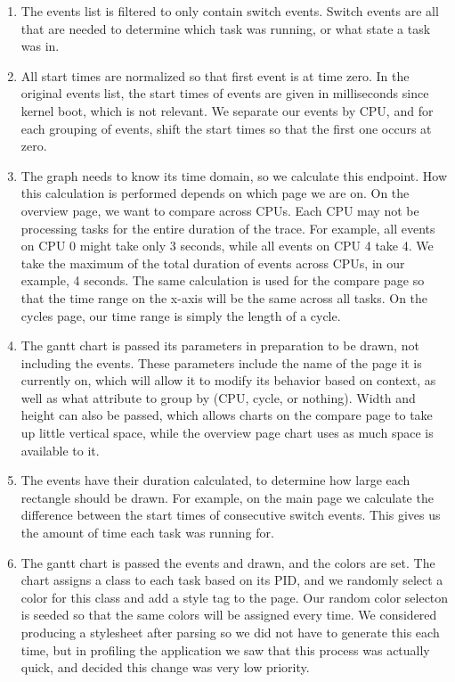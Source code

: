 \documentclass{hmcclinic}
\begin{document}
  \begin{enumerate}

    \item The events list is filtered to only contain switch events. Switch
      events are all that are needed to determine which task was running, or
      what state a task was in.
  
    \item All start times are normalized so that first event is at time zero.
      In the original events list, the start times of events are given in
      milliseconds since kernel boot, which is not relevant. We separate our
      events by CPU, and for each grouping of events, shift the start times
      so that the first one occurs at zero.
  
    \item The graph needs to know its time domain, so we calculate this
      endpoint. How this calculation is performed depends on which page we are
      on. On the overview page, we want to compare across CPUs. Each CPU may not
      be processing tasks for the entire duration of the trace. For example, all
      events on CPU 0 might take only 3 seconds, while all events on CPU 4 take
      4. We take the maximum of the total duration of events across CPUs, in our
      example, 4 seconds. The same calculation is used for the compare page so
      that the time range on the x-axis will be the same across all tasks.  On
      the cycles page, our time range is simply the length of a cycle.
  
    \item The gantt chart is passed its parameters in preparation to be drawn,
      not including the events. These parameters include the name of the page it
      is currently on, which will allow it to modify its behavior based on
      context, as well as what attribute to group by (CPU, cycle, or nothing).
      Width and height can also be passed, which allows charts on the compare
      page to take up little vertical space, while the overview page chart uses
      as much space is available to it.
  
   \item The events have their duration calculated, to determine how large each
     rectangle should be drawn. For example, on the main page we calculate the
     difference between the start times of consecutive switch events. This gives
     us the amount of time each task was running for.
  
   \item The gantt chart is passed the events and drawn, and the colors are set.
     The chart assigns a class to each task based on its PID, and we randomly
     select a color for this class and add a style tag to the page. Our random
     color selecton is seeded so that the same colors will be assigned every
     time. We considered producing a stylesheet after parsing so we did not have
     to generate this each time, but in profiling the application we saw that
     this process was actually quick, and decided this change was very low
     priority.

  \end{enumerate}
\end{document}
